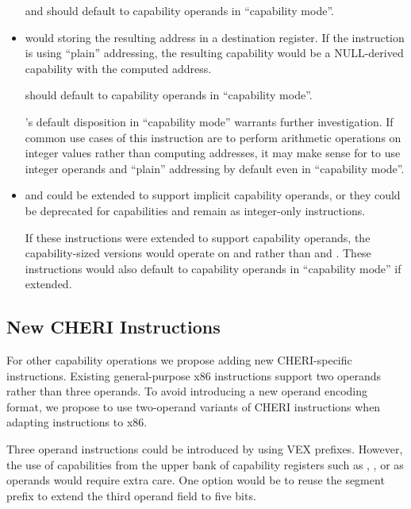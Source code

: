 \begin{itemize}
     and  should default to capability
    operands in ``capability mode''.

  \item {} would storing the resulting address in a
    destination register.  If the instruction is using ``plain''
    addressing, the resulting capability would be a NULL-derived
    capability with the computed address.

     should default to capability operands in
    ``capability mode''.

    's default disposition in ``capability mode''
    warrants further investigation.  If common use cases of this
    instruction are to perform arithmetic operations on integer values
    rather than computing addresses, it may make sense for
     to use integer operands and ``plain'' addressing
    by default even in ``capability mode''.

  \item {} and  could be extended to
    support implicit capability operands, or they could be deprecated
    for capabilities and remain as integer-only instructions.

    If these instructions were extended to support capability
    operands, the capability-sized versions would operate on \CSP{}
    and \CBP{} rather than \RSP{} and \RBP{}.  These instructions
    would also default to capability operands in ``capability mode''
    if extended.
\end{itemize}

\subsection{New CHERI Instructions}

For other capability operations we
propose adding new CHERI-specific instructions.
Existing general-purpose x86 instructions support two operands rather
than three operands.  To avoid introducing a new operand encoding
format, we propose to use two-operand variants of CHERI
instructions when adapting instructions to x86.

Three operand instructions could be introduced by using VEX prefixes.
However, the use of capabilities from the upper bank of capability
registers such as \DDC{}, \CFS{}, or \CGS{} as operands would require
extra care.  One option would be to reuse the \ES{} segment prefix to
extend the third operand field to five bits.

